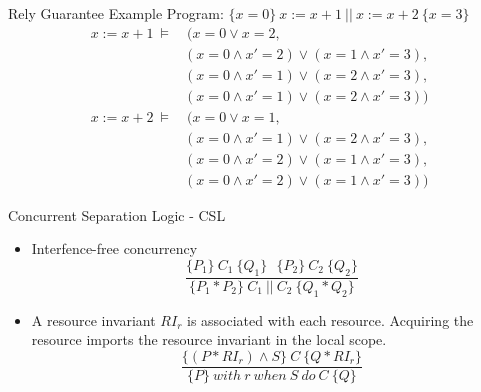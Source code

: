 \documentclass[11pt]{beamer}
\begin{document}
\begin{frame}{Rely Guarantee Example}
 Program: $\{x = 0\}~ x := x + 1 ~||~ x := x + 2 ~\{x = 3\}$ \\
    \pause
  \begin{equation}
    \begin{split}
      x := x + 1 ~\models &~(x = 0 \lor x = 2, \\
      &(x = 0 \land x' = 2) \lor (x = 1 \land x' = 3), \\
      &(x = 0 \land x'=1) \lor (x=2 \land x' = 3), \\
      &(x = 0 \land x' = 1) \lor (x = 2 \land x' = 3)) \nonumber
  \end{split}
  \end{equation}
  \pause
  \begin{equation}
    \begin{split}
      x := x + 2 ~\models &~(x = 0 \lor x = 1, \\
      &(x = 0 \land x' = 1) \lor (x = 2 \land x' = 3), \\
      &(x = 0 \land x'= 2) \lor (x=1 \land x' = 3), \\
      &(x = 0 \land x' = 2) \lor (x = 1 \land x' = 3)) \nonumber
  \end{split}
  \end{equation}
\end{frame}


\begin{frame}{Concurrent Separation Logic - CSL}
  \begin{itemize}
  \item Interfence-free concurrency
    $$\frac{\{P_1\}~C_1~\{Q_1\}~~~\{P_2\}~C_2~\{Q_2\}}{\{P_1 \ast P_2\}~C_1~||~C_2 ~\{Q_1 \ast Q_2
    \}}$$
    \pause
  \item A resource invariant $RI_r$ is associated with each resource. Acquiring
    the resource imports the resource invariant in the local scope.
    $$\frac{\{(P \ast RI_r) \land S\}~C~\{Q \ast RI_r\}}{\{P\}~with~r~when~S~do~C~\{Q\}}$$
  \end{itemize}
\end{frame}
\end{document}
